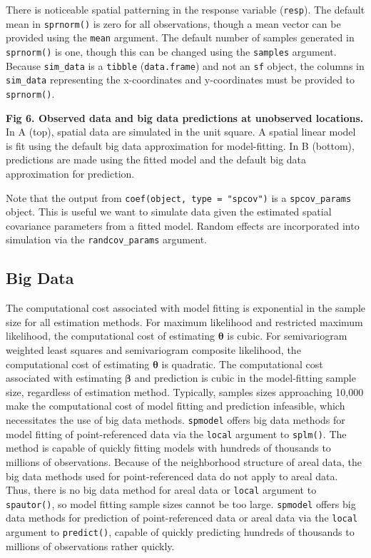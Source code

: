 \documentclass[10pt,letterpaper]{article}
\begin{document}
\noindent There is noticeable spatial patterning in the response
variable (\texttt{resp}). The default mean in \texttt{sprnorm()} is zero
for all observations, though a mean vector can be provided using the
\texttt{mean} argument. The default number of samples generated in
\texttt{sprnorm()} is one, though this can be changed using the
\texttt{samples} argument. Because \texttt{sim\_data} is a
\texttt{tibble} (\texttt{data.frame}) and not an \texttt{sf} object, the
columns in \texttt{sim\_data} representing the x-coordinates and
y-coordinates must be provided to \texttt{sprnorm()}.

\textbf{Fig 6. Observed data and big data predictions at unobserved
locations.} In A (top), spatial data are simulated in the unit square. A
spatial linear model is fit using the default big data approximation for
model-fitting. In B (bottom), predictions are made using the fitted
model and the default big data approximation for prediction.

Note that the output from \texttt{coef(object,\ type\ =\ "spcov")} is a
\texttt{spcov\_params} object. This is useful we want to simulate data
given the estimated spatial covariance parameters from a fitted model.
Random effects are incorporated into simulation via the
\texttt{randcov\_params} argument.

\hypertarget{big-data}{%
\subsection{Big Data}\label{big-data}}

The computational cost associated with model fitting is exponential in
the sample size for all estimation methods. For maximum likelihood and
restricted maximum likelihood, the computational cost of estimating
\(\boldsymbol{\theta}\) is cubic. For semivariogram weighted least
squares and semivariogram composite likelihood, the computational cost
of estimating \(\boldsymbol{\theta}\) is quadratic. The computational
cost associated with estimating \(\boldsymbol{\beta}\) and prediction is
cubic in the model-fitting sample size, regardless of estimation method.
Typically, samples sizes approaching 10,000 make the computational cost
of model fitting and prediction infeasible, which necessitates the use
of big data methods. \texttt{spmodel} offers big data methods for model
fitting of point-referenced data via the \texttt{local} argument to
\texttt{splm()}. The method is capable of quickly fitting models with
hundreds of thousands to millions of observations. Because of the
neighborhood structure of areal data, the big data methods used for
point-referenced data do not apply to areal data. Thus, there is no big
data method for areal data or \texttt{local} argument to
\texttt{spautor()}, so model fitting sample sizes cannot be too large.
\texttt{spmodel} offers big data methods for prediction of
point-referenced data or areal data via the \texttt{local} argument to
\texttt{predict()}, capable of quickly predicting hundreds of thousands
to millions of observations rather quickly.
\end{document}
